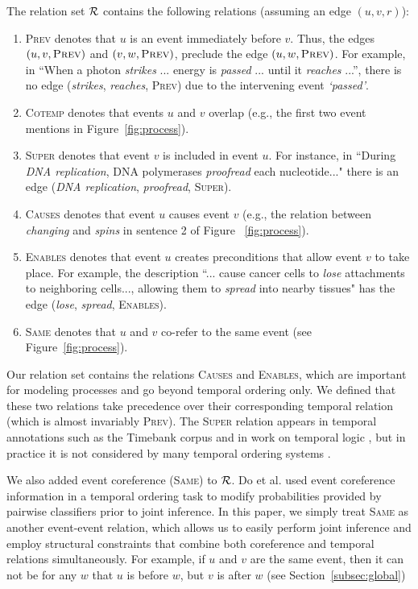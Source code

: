 The relation set $\mathcal{R}$ contains the following relations (assuming an edge $(u,v,r)$):
\begin{enumerate}[itemsep=0pt,topsep=0pt] 
\item \textsc{Prev} denotes that $u$ is an event immediately before $v$. Thus, the edges $(u,v,\mbox{\textsc{Prev}})$ and $(v,w,\mbox{\textsc{Prev}})$, preclude the edge $(u,w,\mbox{\textsc{Prev}})$. For example, in ``When a photon \emph{strikes} ... energy is  \emph{passed} ... until it \emph{reaches} ...'', there is no edge (\emph{strikes}, \emph{reaches}, \textsc{Prev}) due to the intervening event \emph{`passed'}.
\item \textsc{Cotemp} denotes that events $u$ and $v$ overlap (e.g., the first two event mentions in Figure~\ref{fig:process}).
\item \textsc{Super} denotes that event $v$ is included in event $u$. For instance, in ``During \emph{DNA replication}, DNA polymerases \emph{proofread} each nucleotide..." there is an edge (\emph{DNA replication}, \emph{proofread}, \textsc{Super}).
\item \textsc{Causes} denotes that event $u$ causes event $v$ (e.g., the relation between \emph{changing} and \emph{spins} in sentence 2 of Figure ~\ref{fig:process}).
\item \textsc{Enables} denotes that event $u$ creates preconditions that allow event $v$ to take place. For example, the description ``... cause cancer cells  to \emph{lose} attachments to neighboring cells..., allowing them to \emph{spread} into nearby tissues" has the edge (\emph{lose}, \emph{spread}, \textsc{Enables}).
\item \textsc{Same} denotes that $u$ and $v$ co-refer to the same event (see Figure~\ref{fig:process}).
\end{enumerate}

Our relation set contains the relations \textsc{Causes} and \textsc{Enables}, which are important for modeling processes and go beyond temporal ordering only. We defined that these two relations take precedence over their corresponding temporal relation (which is almost invariably \textsc{Prev}). The \textsc{Super} relation appears in temporal annotations such as the Timebank corpus \cite{Pustejovsky03} and in work on temporal logic \cite{Allen83}, but in practice it is not considered by many temporal ordering systems \cite{Chambers08,Yoshikawa09,Do12}. 

We also added event coreference (\textsc{Same}) to $\mathcal{R}$. Do et al.  used event coreference information in a temporal ordering task to modify probabilities provided by pairwise classifiers prior to joint inference. In this paper, we simply treat \textsc{Same} as another event-event relation, which allows us to easily perform joint inference and employ structural constraints that combine both coreference and temporal relations simultaneously. For example, if $u$ and $v$ are the same event, then it can not be for any $w$ that $u$ is before $w$, but $v$ is after $w$ (see Section~\ref{subsec:global})


